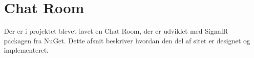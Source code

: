 \section{Chat Room}
Der er i projektet blevet lavet en Chat Room, der er udviklet med SignalR packagen fra NuGet. Dette afsnit beskriver hvordan den del af sitet er designet og implementeret. 

